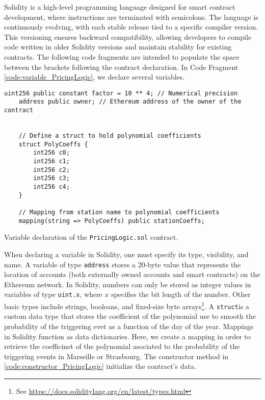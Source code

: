 \documentclass[10pt]{article}
\begin{document}
Solidity is a high-level programming language designed for smart contract development, where instructions are terminated with semicolons. The language is continuously evolving, with each stable release tied to a specific compiler version. This versioning ensures backward compatibility, allowing developers to compile code written in older Solidity versions and maintain stability for existing contracts. The following code fragments are intended to populate the space between the brackets following the contract declaration. In Code Fragment \ref{code:variable_PricingLogic}, we declare several variables.
\begin{codefragment}[!h]
\begin{lstlisting}[language=Solidity]
    uint256 public constant factor = 10 ** 4; // Numerical precision
    address public owner; // Ethereum address of the owner of the contract
    

    // Define a struct to hold polynomial coefficients
    struct PolyCoeffs {
        int256 c0;
        int256 c1;
        int256 c2;
        int256 c3;
        int256 c4;
    }

    // Mapping from station name to polynomial coefficients
    mapping(string => PolyCoeffs) public stationCoeffs;
\end{lstlisting}
    \caption{Variable declaration of the \texttt{PricingLogic.sol} contract.}
    \label{code:variable_PricingLogic}
\end{codefragment}
When declaring a variable in Solidity, one must specify its type, visibility, and name. A variable of type \texttt{address} stores a 20-byte value that represents the location of accounts (both externally owned accounts and smart contracts) on the Ethereum network. In Solidity, numbers can only be stored as integer values in variables of type \texttt{uint.x}, where \(x\) specifies the bit length of the number. Other basic types include strings, booleans, and fixed-size byte arrays\footnote{See \url{https://docs.soliditylang.org/en/latest/types.html}}. A \texttt{struct}is a custom data type that stores the coefficient of the polynomial use to smooth the probability of the triggering evet as a function of the day of the year. Mappings in Solidity function as data dictionaries. Here, we create a mapping in order to retrieve the coefficinet of the polynomial asociated to the probability of the triggering events in Marseille or Strasbourg. The constructor method in \ref{code:constructor_PricingLogic} initialize the contract's data. 
\end{document}
